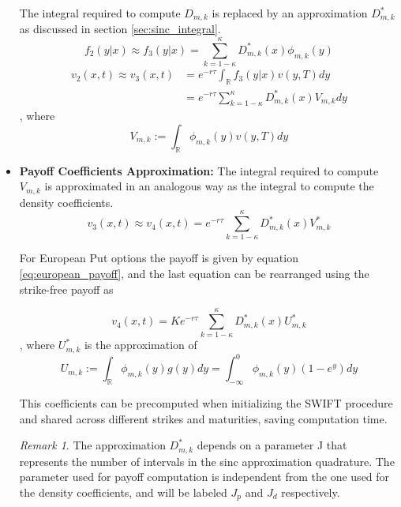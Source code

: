 \documentclass[12,twoside]{mammeTFM}
\theoremstyle{definition}
\theoremstyle{remark}
\newtheorem{remark}[thm]{Remark}
\newcommand{\R}{\ensuremath{\mathbb{R}}}
\begin{document}
\begin{itemize}
The integral required to compute $D_{m,k}$ is replaced by an approximation $D_{m,k}^{*}$ as discussed in section \ref{sec:sinc_integral}.
\begin{equation}
f_2 (y|x) \approx f_3(y | x) = \sum_{k = 1 - \kappa}^{\kappa} D_{m,k}^{*}(x)\phi_{m,k}(y)
\end{equation}
\begin{equation}
\begin{aligned}
v_2(x,t) \approx v_3(x,t) & = e^{-r \tau} \int_{\R} f_3(y|x)v(y, T)dy \\
&= e^{-r \tau} \sum_{k = 1 - \kappa}^{\kappa} D_{m,k}^{*}(x)  V_{m,k}dy
\end{aligned}
\end{equation}
, where
\begin{equation}
V_{m,k} := \int_{\R} \phi_{m,k}(y) v(y, T)dy
\end{equation}
\item \textbf{Payoff Coefficients Approximation: }
The integral required to compute $V_{m,k}$ is approximated in an analogous way as the integral to compute the density coefficients.
\begin{equation}
v_3(x,t) \approx v_4(x,t) = e^{-r \tau} \sum_{k = 1 - \kappa}^{\kappa} D_{m,k}^{*}(x) V_{m,k}^{*}
\end{equation}

For European Put options the payoff is given by equation \ref{eq:european_payoff}, and the last equation can be rearranged using the strike-free payoff as

\begin{equation} \label{step:final}
v_4(x,t) = K e^{-r \tau} \sum_{k = 1 - \kappa}^{\kappa} D_{m,k}^{*}(x) U_{m,k}^{*}
\end{equation}
, where $U_{m,k}^{*}$ is the approximation of 
\begin{equation} \label{eq:compact_payoffs}
U_{m,k} := \int_{\R} \phi_{m,k}(y)g(y) dy = \int_{-\infty}^{0} \phi_{m,k}(y)(1-e^{y}) dy
\end{equation}

This coefficients can be precomputed when initializing the SWIFT procedure and shared across different strikes and maturities, saving computation time.
\begin{remark}
The approximation $D_{m,k}^{*}$ depends on a parameter J that represents the number of intervals in the sinc approximation quadrature. The parameter used for payoff computation is independent from the one used for the density coefficients, and will be labeled $J_p$ and $J_d$ respectively.
\end{remark}
\end{itemize}
\end{document}

